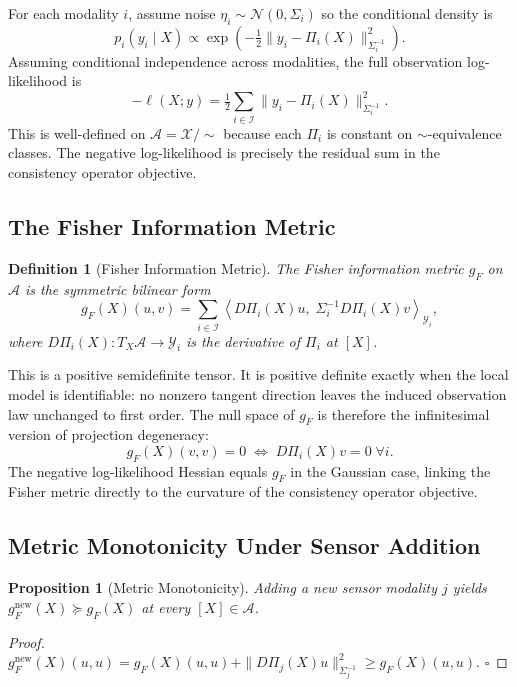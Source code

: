 \documentclass[11pt, oneside]{article}
\newtheorem{proposition}[theorem]{Proposition}
\newtheorem{definition}[theorem]{Definition}
\newcommand{\Xmod}{\mathcal{X}/{\sim}}
\begin{document}
For each modality $i$, assume noise $\eta_i \sim \mathcal{N}(0, \Sigma_i)$ so the
conditional density is
\[
p_i(y_i \mid X) \propto \exp\!\left(
-\tfrac{1}{2}\|y_i - \Pi_i(X)\|_{\Sigma_i^{-1}}^2
\right).
\]
Assuming conditional independence across modalities, the full observation log-likelihood is
\[
-\ell(X; y) = \tfrac{1}{2}\sum_{i \in \mathcal{I}} \|y_i - \Pi_i(X)\|_{\Sigma_i^{-1}}^2.
\]
This is well-defined on $\mathcal{A} = \Xmod$ because each $\Pi_i$ is constant on
$\sim$-equivalence classes. The negative log-likelihood is precisely the residual sum
in the consistency operator objective.

\subsection{The Fisher Information Metric}

\begin{definition}[Fisher Information Metric]
The Fisher information metric $g_F$ on $\mathcal{A}$ is the symmetric bilinear form
\[
g_F(X)(u, v) = \sum_{i \in \mathcal{I}}
\left\langle D\Pi_i(X)u,\; \Sigma_i^{-1} D\Pi_i(X)v \right\rangle_{\mathcal{Y}_i},
\]
where $D\Pi_i(X) : T_X\mathcal{A} \to \mathcal{Y}_i$ is the derivative of $\Pi_i$ at $[X]$.
\end{definition}

This is a positive semidefinite tensor. It is positive definite exactly when the local
model is identifiable: no nonzero tangent direction leaves the induced observation law
unchanged to first order. The null space of $g_F$ is therefore the infinitesimal version
of projection degeneracy:
\[
g_F(X)(v,v) = 0 \;\Longleftrightarrow\; D\Pi_i(X)v = 0 \;\forall i.
\]
The negative log-likelihood Hessian equals $g_F$ in the Gaussian case, linking the
Fisher metric directly to the curvature of the consistency operator objective.

\subsection{Metric Monotonicity Under Sensor Addition}

\begin{proposition}[Metric Monotonicity]
\label{prop:metric_monotone}
Adding a new sensor modality $j$ yields
$g_F^{\mathrm{new}}(X) \succeq g_F(X)$ at every $[X] \in \mathcal{A}$.
\end{proposition}
\begin{proof}
$g_F^{\mathrm{new}}(X)(u,u) = g_F(X)(u,u) +
\|D\Pi_j(X)u\|_{\Sigma_j^{-1}}^2 \ge g_F(X)(u,u)$.
$\square$
\end{proof}
\end{document}
